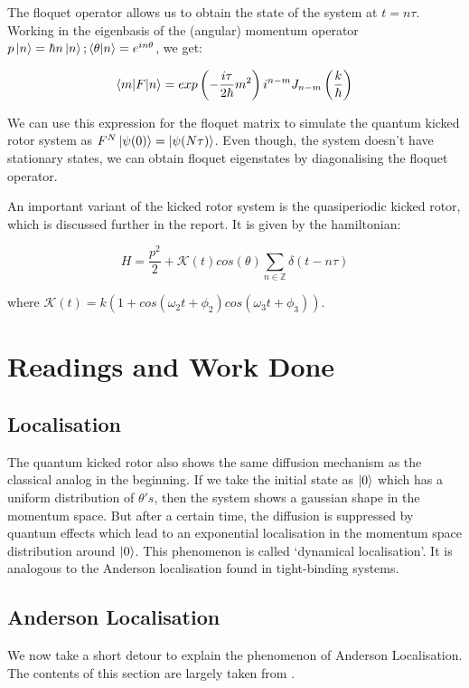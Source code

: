 \documentclass[twocolumn]{report}
\begin{document}
The floquet operator allows us to obtain the state of the system at $t = n\tau$.
Working in the eigenbasis of the (angular) momentum operator
$p \ket{n} = \hbar n \ket{n}; \braket{\theta | n} = e^{in\theta}$, we get:

\begin{equation}
    \braket{m | F | n} = exp\left(-\frac{i \tau}{2\hbar}m^2\right) i^{n-m}
    J_{n-m}\left(\frac{k}{\hbar}\right)
\end{equation}

We can use this expression for the floquet matrix to simulate the quantum
kicked rotor system as $F^N \ket{\psi(0)} = \ket{\psi(N\tau)}$. Even though,
the system doesn't have stationary states, we can obtain floquet eigenstates
by diagonalising the floquet operator.

An important variant of the kicked rotor system is the quasiperiodic kicked
rotor, which is discussed further in the report. It is given by the
hamiltonian:

\begin{equation}
H = \frac{p^2}{2} + \mathcal{K}(t) cos(\theta)\sum_{n \in \mathbb{Z}}
\delta(t - n\tau)
\end{equation}

where $\mathcal{K}(t) = k(1 + cos(\omega_2 t + \phi_2) cos(\omega_3 t
+ \phi_3))$.

\chapter{Readings and Work Done}
\section{Localisation}
The quantum kicked rotor also shows the same diffusion mechanism as the
classical analog in the beginning. If we take the initial state as $\ket{0}$
which has a uniform distribution of $\theta's$, then the system shows a
gaussian shape in the momentum space. But after a certain time, the
diffusion is suppressed by quantum effects which lead to an exponential
localisation in the momentum space distribution around $\ket{0}$. This
phenomenon is called `dynamical localisation'. It is analogous to the
Anderson localisation found in tight-binding systems.

\section{Anderson Localisation}
We now take a short detour to explain the phenomenon of Anderson Localisation.
The contents of this section are largely taken from \cite{muller_disorder_2016}.
\end{document}

